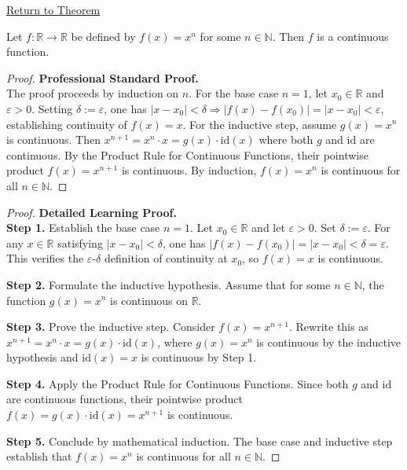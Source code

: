 \newpage
{}
\label{prf:power-function-continuous}

\begin{remark*}[Return]
\hyperref[lem:power-function-continuous]{Return to Theorem}
\end{remark*}

\begin{theorem*}
Let $f : \mathbb{R} \to \mathbb{R}$ be defined by $f(x) = x^n$ for some $n \in \mathbb{N}$. Then $f$ is a continuous function.
\end{theorem*}

\begin{proof}
\textbf{Professional Standard Proof.}~\\
The proof proceeds by induction on $n$. For the base case $n = 1$, let $x_0 \in \mathbb{R}$ and $\varepsilon > 0$. Setting $\delta := \varepsilon$, one has $|x - x_0| < \delta \Rightarrow |f(x) - f(x_0)| = |x - x_0| < \varepsilon$, establishing continuity of $f(x) = x$. For the inductive step, assume $g(x) = x^n$ is continuous. Then $x^{n+1} = x^n \cdot x = g(x) \cdot \mathrm{id}(x)$ where both $g$ and $\mathrm{id}$ are continuous. By the Product Rule for Continuous Functions, their pointwise product $f(x) = x^{n+1}$ is continuous. By induction, $f(x) = x^n$ is continuous for all $n \in \mathbb{N}$.
\end{proof}

\begin{proof}
\textbf{Detailed Learning Proof.}~\\

\textbf{Step 1.} Establish the base case $n = 1$. Let $x_0 \in \mathbb{R}$ and let $\varepsilon > 0$. Set $\delta := \varepsilon$. For any $x \in \mathbb{R}$ satisfying $|x - x_0| < \delta$, one has $|f(x) - f(x_0)| = |x - x_0| < \delta = \varepsilon$. This verifies the $\varepsilon$-$\delta$ definition of continuity at $x_0$, so $f(x) = x$ is continuous.

\textbf{Step 2.} Formulate the inductive hypothesis. Assume that for some $n \in \mathbb{N}$, the function $g(x) = x^n$ is continuous on $\mathbb{R}$.

\textbf{Step 3.} Prove the inductive step. Consider $f(x) = x^{n+1}$. Rewrite this as $x^{n+1} = x^n \cdot x = g(x) \cdot \mathrm{id}(x)$, where $g(x) = x^n$ is continuous by the inductive hypothesis and $\mathrm{id}(x) = x$ is continuous by Step 1.

\textbf{Step 4.} Apply the Product Rule for Continuous Functions. Since both $g$ and $\mathrm{id}$ are continuous functions, their pointwise product $f(x) = g(x) \cdot \mathrm{id}(x) = x^{n+1}$ is continuous.

\textbf{Step 5.} Conclude by mathematical induction. The base case and inductive step establish that $f(x) = x^n$ is continuous for all $n \in \mathbb{N}$.
\end{proof}

